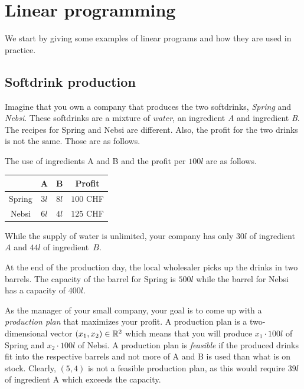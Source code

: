 \chapter{Linear programming}
\label{cha:introduction-1}

We start by giving some examples of linear programs and how they are
used in practice. 
 





\section{Softdrink production}
\label{sec:healthy-low-priced}

Imagine that you own a company that produces the two softdrinks,
\emph{Spring} and \emph{Nebsi}. These softdrinks are a mixture of
\emph{water}, an ingredient \emph{A} and ingredient \emph{B}.
The recipes for Spring and Nebsi are different. Also, the profit for the two drinks is not the same. Those are as follows. 

The use  of ingredients A and B and the profit  per $100l$ are as follows. 
\begin{center}
  \begin{tabular}{c|c|c|c}
    &  A &  B & Profit  \\\hline
    Spring      & $3l$          & $8l$ & $100$ CHF\\\hline 
    Nebsi      & $6l$           & $4l$ & $125$ CHF
  \end{tabular}
\end{center}
%
While the supply of water is unlimited, your company has only $30l$ of
ingredient~$A$ and $44l$ of ingredient~$B$.

At the end of the production day, the local wholesaler picks up the
drinks in two barrels. The capacity of the barrel for Spring is $500l$
while the barrel for Nebsi has a capacity of $400l$.

As the manager of your small company, your goal is to come up with a
\emph{production plan} that maximizes your profit. A production plan
is a two-dimensional vector $(x_1,x_2) \in \mathbb{R}^2$ which means that you
will produce $x_1 \cdot 100 l$ of Spring and $x_2 \cdot 100 l$ of
Nebsi. A production plan is \emph{feasible} if the produced drinks fit
into the respective barrels and not more of A and B is used than what
is on stock. Clearly, $(5,4)$ is not a feasible production plan, as
this would require $39l$ of ingredient A which exceeds the capacity.





